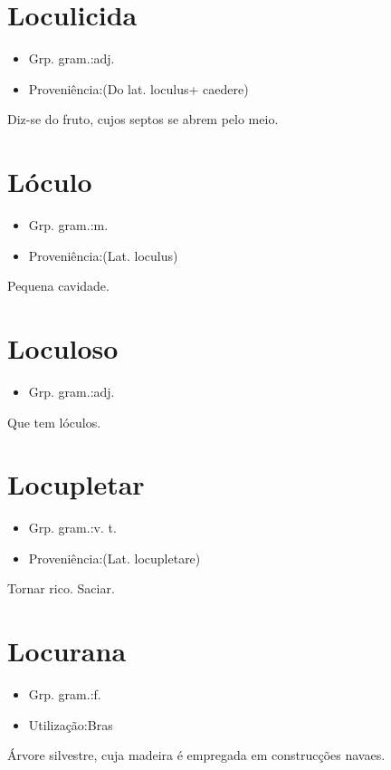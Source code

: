 \section{Loculicida}
\begin{itemize}
\item {Grp. gram.:adj.}
\end{itemize}
\begin{itemize}
\item {Proveniência:(Do lat. \textunderscore loculus\textunderscore  + \textunderscore caedere\textunderscore )}
\end{itemize}
Diz-se do fruto, cujos septos se abrem pelo meio.
\section{Lóculo}
\begin{itemize}
\item {Grp. gram.:m.}
\end{itemize}
\begin{itemize}
\item {Proveniência:(Lat. \textunderscore loculus\textunderscore )}
\end{itemize}
Pequena cavidade.
\section{Loculoso}
\begin{itemize}
\item {Grp. gram.:adj.}
\end{itemize}
Que tem lóculos.
\section{Locupletar}
\begin{itemize}
\item {Grp. gram.:v. t.}
\end{itemize}
\begin{itemize}
\item {Proveniência:(Lat. \textunderscore locupletare\textunderscore )}
\end{itemize}
Tornar rico.
Saciar.
\section{Locurana}
\begin{itemize}
\item {Grp. gram.:f.}
\end{itemize}
\begin{itemize}
\item {Utilização:Bras}
\end{itemize}
Árvore silvestre, cuja madeira é empregada em construcções navaes.
